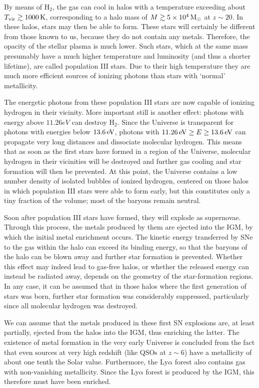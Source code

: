 \documentclass[a4paper,11pt]{article}
\begin{document}
{\noindent}By means of H$_2$, the gas can cool in halos with a temperature exceeding about $T_\mathrm{vir}\gtrsim1000\,{\rm K}$, corresponding to a halo mass of $M\gtrsim5\times10^4\,{\rm M_\odot}$ at $z\sim20$. In these halos, stars may then be able to form. These stars will certainly be different from those known to us, because they do not contain any metals. Therefore, the opacity of the stellar plasma is much lower. Such stars, which at the same mass presumably have a much higher temperature and luminosity (and thus a shorter lifetime), are called population III stars. Due to their high temperature they are much more efficient sources of ionizing photons than stars with `normal' metallicity.

{\noindent}The energetic photons from these population III stars are now capable of ionizing hydrogen in their vicinity. More important still is another effect: photons with energy above $11.26eV$ can destroy H$_2$. Since the Universe is transparent for photons with energies below $13.6\,{\rm eV}$, photons with $11.26\,{\rm eV}\geq E \geq 13.6\,{\rm eV}$ can propagate very long distances and dissociate molecular hydrogen. This means that as soon as the first stars have formed in a region of the Universe, molecular hydrogen in their vicinities will be destroyed and further gas cooling and star formation will then be prevented. At this point, the Universe contains a low number density of isolated bubbles of ionized hydrogen, centered on those halos in which population III stars were able to form early, but this constitutes only a tiny fraction of the volume; most of the baryons remain neutral.

{\noindent}Soon after population III stars have formed, they will explode as supernovae. Through this process, the metals produced by them are ejected into the IGM, by which the initial metal enrichment occurs. The kinetic energy transferred by SNe to the gas within the halo can exceed its binding energy, so that the baryons of the halo can be blown away and further star formation is prevented. Whether this effect may indeed lead to gas-free halos, or whether the released energy can instead be radiated away, depends on the geometry of the star-formation regions. In any case, it can be assumed that in those halos where the first generation of stars was born, further star formation was considerably suppressed, particularly since all molecular hydrogen was destroyed.

{\noindent}We can assume that the metals produced in these first SN explosions are, at least partially, ejected from the halos into the IGM, thus enriching the latter. The existence of metal formation in the very early Universe is concluded from the fact that even sources at very high redshift (like QSOs at $z\sim6$) have a metallicity of about one tenth the Solar value. Furthermore, the Ly$\alpha$ forest also contains gas with non-vanishing metallicity. Since the Ly$\alpha$ forest is produced by the IGM, this therefore must have been enriched.
\end{document}
